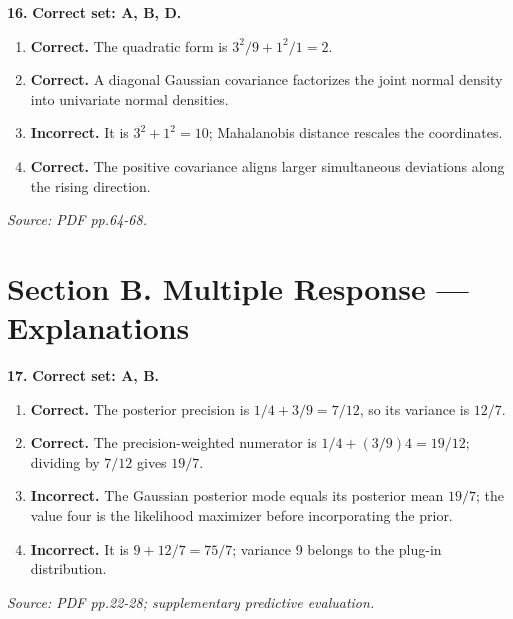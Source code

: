\documentclass[11pt,a4paper]{article}
\begin{document}
\par\noindent\begin{minipage}{\linewidth}
\textbf{16.} \textbf{Correct set: A, B, D.}
\begin{enumerate}[label=(\Alph*),leftmargin=8mm,itemsep=2pt,topsep=2pt]
\item \textbf{Correct.} The quadratic form is \(3^2/9+1^2/1=2\).
\item \textbf{Correct.} A diagonal Gaussian covariance factorizes the joint normal density into univariate normal densities.
\item \textbf{Incorrect.} It is \(3^2+1^2=10\); Mahalanobis distance rescales the coordinates.
\item \textbf{Correct.} The positive covariance aligns larger simultaneous deviations along the rising direction.
\end{enumerate}
{\footnotesize\textit{Source: PDF pp.64-68.}}

\end{minipage}\par\vspace{3mm}
\newpage\section*{Section B. Multiple Response --- Explanations}
\par\noindent\begin{minipage}{\linewidth}
\textbf{17.} \textbf{Correct set: A, B.}
\begin{enumerate}[label=(\Alph*),leftmargin=8mm,itemsep=2pt,topsep=2pt]
\item \textbf{Correct.} The posterior precision is \(1/4+3/9=7/12\), so its variance is \(12/7\).
\item \textbf{Correct.} The precision-weighted numerator is \(1/4+(3/9)4=19/12\); dividing by \(7/12\) gives \(19/7\).
\item \textbf{Incorrect.} The Gaussian posterior mode equals its posterior mean \(19/7\); the value four is the likelihood maximizer before incorporating the prior.
\item \textbf{Incorrect.} It is \(9+12/7=75/7\); variance 9 belongs to the plug-in distribution.
\end{enumerate}
{\footnotesize\textit{Source: PDF pp.22-28; supplementary predictive evaluation.}}

\end{minipage}\par\vspace{3mm}
\end{document}
